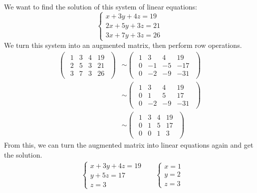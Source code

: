 \documentclass{huhtakm-template-book}
\begin{document}
\begin{eg}
    We want to find the solution of this system of linear equations:
    \begin{equation*}
        \begin{cases}
            x+3y+4z=19\\
            2x+5y+3z=21\\
            3x+7y+3z=26
        \end{cases}
    \end{equation*}
    We turn this system into an augmented matrix, then perform row operations.
    \begin{align*}
        \begin{pmatrix}
            \begin{array}{ccc|c}
                1 & 3 & 4 & 19\\
                2 & 5 & 3 & 21\\
                3 & 7 & 3 & 26
            \end{array}
        \end{pmatrix}&\sim\begin{pmatrix}
            \begin{array}{ccc|c}
                1 & 3 & 4 & 19\\
                0 & -1 & -5 & -17\\
                0 & -2 & -9 & -31
            \end{array}
        \end{pmatrix}\\
        &\sim\begin{pmatrix}
            \begin{array}{ccc|c}
                1 & 3 & 4 & 19\\
                0 & 1 & 5 & 17\\
                0 & -2 & -9 & -31
            \end{array}
        \end{pmatrix}\\
        &\sim\begin{pmatrix}
            \begin{array}{ccc|c}
                1 & 3 & 4 & 19\\
                0 & 1 & 5 & 17\\
                0 & 0 & 1 & 3
            \end{array}
        \end{pmatrix}
    \end{align*}
    From this, we can turn the augmented matrix into linear equations again and get the solution.
    \begin{align*}
        &\begin{cases}
            x+3y+4z=19\\
            y+5z=17\\
            z=3
        \end{cases} & &\begin{cases}
            x=1\\
            y=2\\
            z=3
        \end{cases}
    \end{align*}
\end{eg}
\end{document}

